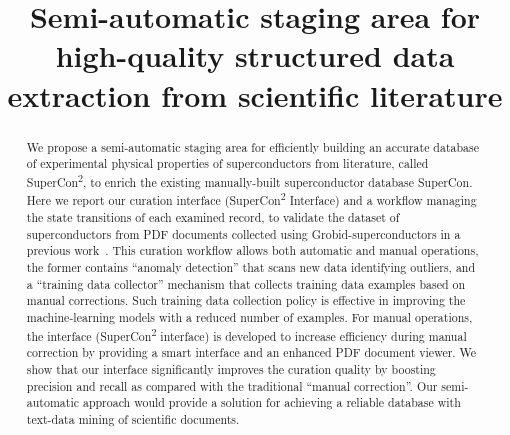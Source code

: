 \documentclass[]{interact}
\theoremstyle{plain} %
\theoremstyle{definition}
\theoremstyle{remark}
\begin{document}

\title{Semi-automatic staging area for high-quality structured data extraction from scientific literature}

\author{
}

\maketitle

\begin{abstract}
We propose a semi-automatic staging area for efficiently building an accurate database of experimental physical properties of superconductors from literature, called SuperCon\textsuperscript{2}, to enrich the existing manually-built superconductor database SuperCon. 
Here we report our curation interface (SuperCon\textsuperscript{2} Interface) and a workflow managing the state transitions of each examined record, to validate the dataset of superconductors from PDF documents collected using Grobid-superconductors in a previous work~\cite{lfoppiano2023automatic}. 
This curation workflow allows both automatic and manual operations, the former contains ``anomaly detection'' that scans new data identifying outliers, and a ``training data collector'' mechanism that collects training data examples based on manual corrections. 
Such training data collection policy is effective in improving the machine-learning models with a reduced number of examples. 
For manual operations, the interface (SuperCon\textsuperscript{2} interface) is developed to increase efficiency during manual correction by providing a smart interface and an enhanced PDF document viewer. 
We show that our interface significantly improves the curation quality by boosting precision and recall as compared with the traditional ``manual correction''.  
Our semi-automatic approach would provide a solution for achieving a reliable database with text-data mining of scientific documents.

\end{abstract}
\end{document}
